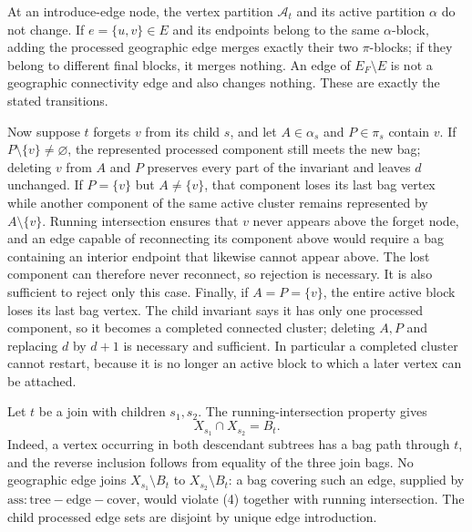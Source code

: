 At an introduce-edge node, the vertex partition \(\mathscr A_t\) and its active partition \(\alpha\) do not change.  If \(e=\{u,v\}\in E\) and its endpoints belong to the same \(\alpha\)-block, adding the processed geographic edge merges exactly their two \(\pi\)-blocks; if they belong to different final blocks, it merges nothing.  An edge of \(E_F\setminus E\) is not a geographic connectivity edge and also changes nothing.  These are exactly the stated transitions.

Now suppose \(t\) forgets \(v\) from its child \(s\), and let \(A\in\alpha_s\) and \(P\in\pi_s\) contain \(v\).  If \(P\setminus\{v\}\ne\varnothing\), the represented processed component still meets the new bag; deleting \(v\) from \(A\) and \(P\) preserves every part of the invariant and leaves \(d\) unchanged.  If \(P=\{v\}\) but \(A\ne\{v\}\), that component loses its last bag vertex while another component of the same active cluster remains represented by \(A\setminus\{v\}\).  Running intersection ensures that \(v\) never appears above the forget node, and an edge capable of reconnecting its component above would require a bag containing an interior endpoint that likewise cannot appear above.  The lost component can therefore never reconnect, so rejection is necessary.  It is also sufficient to reject only this case.  Finally, if \(A=P=\{v\}\), the entire active block loses its last bag vertex.  The child invariant says it has only one processed component, so it becomes a completed connected cluster; deleting \(A,P\) and replacing \(d\) by \(d+1\) is necessary and sufficient.  In particular a completed cluster cannot restart, because it is no longer an active block to which a later vertex can be attached.

Let \(t\) be a join with children \(s_1,s_2\).  The running-intersection property gives
\[
 X_{s_1}\cap X_{s_2}=B_t.
\tag{4}
\]
Indeed, a vertex occurring in both descendant subtrees has a bag path through \(t\), and the reverse inclusion follows from equality of the three join bags.  No geographic edge joins \(X_{s_1}\setminus B_t\) to \(X_{s_2}\setminus B_t\): a bag covering such an edge, supplied by \(\mathrm{ass:tree-edge-cover}\), would violate (4) together with running intersection.  The child processed edge sets are disjoint by unique edge introduction.

